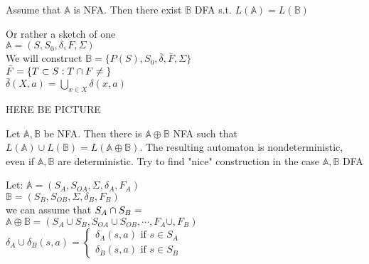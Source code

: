 \thm{}
{
    Assume that $\mathbb{A}$ is NFA. Then there exist $\mathbb{B}$ DFA s.t.
    $L(\mathbb{A}) = L(\mathbb{B})$
}

\begin{myproof}
    Or rather a sketch of one \\
    $\mathbb{A} = (S,S_0,\delta,F,\Sigma)$ \\
    We will construct $\mathbb{B} = \{P(S),S_0,\bar{\delta},\bar{F},\Sigma\}$ \\
    $\bar{F}= \{T \subset S: T \cap F \neq \null\}$\\
    $\bar{\delta}(X,a) = \bigcup_{x\in X}\delta(x,a)$

    HERE BE PICTURE
\end{myproof}


\thm{}
{
    Let $\mathbb{A}, \mathbb{B}$ be NFA. Then there is $\mathbb{A}\oplus \mathbb{B}$ NFA such that $L(\mathbb{A})\cup L(\mathbb{B}) = L(\mathbb{A}\oplus \mathbb{B})$.
\nt
{
    The resulting automaton is nondeterministic, even if $\mathbb{A}, \mathbb{B}$ are deterministic.
}
\qs{}
{
    Try to find "nice" construction in the case $\mathbb{A}, \mathbb{B}$ DFA
}
}

\begin{myproof}
    Let:
    $\mathbb{A} = (S_A,S_{OA},\Sigma,\delta_A,F_A)$ \\
    $\mathbb{B} = (S_B,S_{OB},\Sigma,\delta_B,F_B)$ \\
    we can assume that $S_A \cap S_B = \empty$\\
    $\mathbb{A}\oplus \mathbb{B} = (S_A\cup S_B,S_{OA}\cup S_{OB},\cdots ,F_A \cup , F_B)$\\
   $ 
        \delta_A \cup \delta_B(s,a) = \begin{cases}
            \delta_A(s,a) \text{ if } s\in S_A\\
            \delta_B(s,a) \text{ if } s\in S_B
        \end{cases}
    $ 

\end{myproof}

